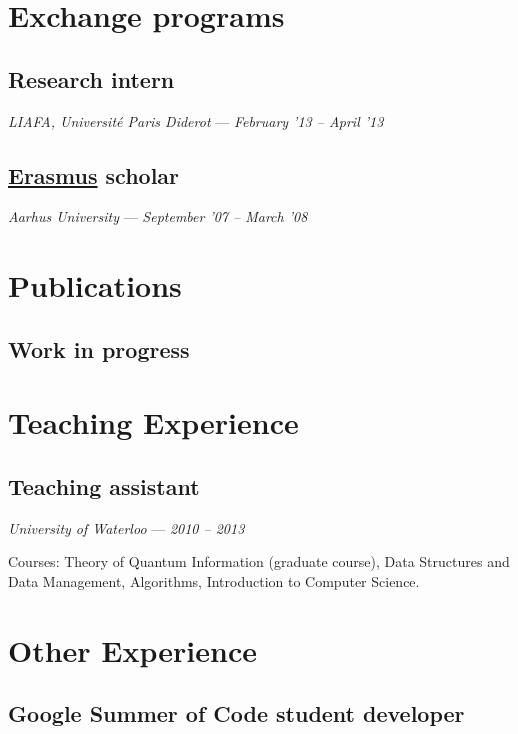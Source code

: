 \documentclass[]{article}
\begin{document}
\section{Exchange programs}\label{exchange-programs}

\subsection{Research intern}\label{research-intern}

\emph{LIAFA, Université Paris Diderot} --- \emph{February '13 -- April
'13}

\subsection{\href{http://en.wikipedia.org/wiki/Erasmus_Programme}{Erasmus}
scholar}\label{erasmus-scholar}

\emph{Aarhus University} --- \emph{September '07 -- March '08}


\section{Publications}\label{publications}


\subsection{Work in progress}


\section{Teaching Experience}\label{teaching-experience}

\subsection{Teaching assistant}\label{teaching-assistant}

\emph{University of Waterloo} --- \emph{2010 -- 2013}

Courses: Theory of Quantum Information (graduate course), Data
Structures and Data Management, Algorithms, Introduction to Computer
Science.


\section{Other Experience}\label{work-experience}

\subsection{Google Summer of Code student
developer}\label{google-summer-of-code-student-developer}
\end{document}
